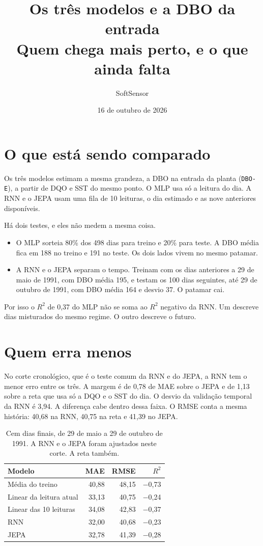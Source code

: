 \documentclass[11pt,a4paper]{article}
\title{Os três modelos e a DBO da entrada\\[0.3em]
\large Quem chega mais perto, e o que ainda falta}
\author{SoftSensor}
\date{16 de outubro de 2026}
\begin{document}
\maketitle

\section{O que está sendo comparado}

Os três modelos estimam a mesma grandeza, a DBO na entrada da planta (\texttt{DBO-E}), a partir de DQO e SST do mesmo ponto. O MLP usa só a leitura do dia. A RNN e o JEPA usam uma fila de 10 leituras, o dia estimado e as nove anteriores disponíveis.

Há dois testes, e eles não medem a mesma coisa.

\begin{itemize}
\item O MLP sorteia 80\% dos 498 dias para treino e 20\% para teste. A DBO média fica em 188 no treino e 191 no teste. Os dois lados vivem no mesmo patamar.
\item A RNN e o JEPA separam o tempo. Treinam com os dias anteriores a 29 de maio de 1991, com DBO média 195, e testam os 100 dias seguintes, até 29 de outubro de 1991, com DBO média 164 e desvio 37. O patamar cai.
\end{itemize}

Por isso o \(R^{2}\) de 0,37 do MLP não se soma ao \(R^{2}\) negativo da RNN. Um descreve dias misturados do mesmo regime. O outro descreve o futuro.

\section{Quem erra menos}

No corte cronológico, que é o teste comum da RNN e do JEPA, a RNN tem o menor erro entre os três. A margem é de 0,78 de MAE sobre o JEPA e de 1,13 sobre a reta que usa só a DQO e o SST do dia. O desvio da validação temporal da RNN é 3,94. A diferença cabe dentro dessa faixa. O RMSE conta a mesma história: 40,68 na RNN, 40,75 na reta e 41,39 no JEPA.

\begin{table}[ht]
\centering
\caption{Cem dias finais, de 29 de maio a 29 de outubro de 1991. A RNN e o JEPA foram ajustados neste corte. A reta também.}
\begin{tabular}{lrrr}
\toprule
Modelo & MAE & RMSE & \(R^{2}\) \\
\midrule
Média do treino & 40,88 & 48,15 & $-$0,73 \\
Linear da leitura atual & 33,13 & 40,75 & $-$0,24 \\
Linear das 10 leituras & 34,08 & 42,83 & $-$0,37 \\
RNN & 32,00 & 40,68 & $-$0,23 \\
JEPA & 32,78 & 41,39 & $-$0,28 \\
\bottomrule
\end{tabular}
\end{table}
\end{document}
